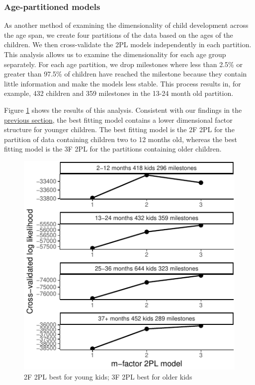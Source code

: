 \documentclass[10pt, letterpaper]{article}
\newenvironment{CodeChunk}{}{}
\begin{document}
\vskip 0.1in

\hypertarget{age-partitioned-models}{%
\subsubsection{Age-partitioned models}\label{age-partitioned-models}}

As another method of examining the dimensionality of child development
across the age span, we create four partitions of the data based on the
ages of the children. We then cross-validate the 2PL models
independently in each partition. This analysis allows us to examine the
dimensionality for each age group separately. For each age partition, we
drop milestones where less than 2.5\% or greater than 97.5\% of children
have reached the milestone because they contain little information and
make the models less stable. This process results in, for example, 432
children and 359 milestones in the 13-24 month old partition.

Figure \ref{fig:partage} shows the results of this analysis. Consistent
with our findings in the \protect\hyperlink{full}{previous section}, the
best fitting model contains a lower dimensional factor structure for
younger children. The best fitting model is the 2F 2PL for the partition
of data containing children two to 12 months old, whereas the best
fitting model is the 3F 2PL for the partitions containing older
children.

\begin{CodeChunk}
\begin{figure}[tb]
\includegraphics{figs/partage-1} \caption[2F 2PL best for young kids]{2F 2PL best for young kids; 3F 2PL best for older kids}\label{fig:partage}
\end{figure}
\end{CodeChunk}
\end{document}
